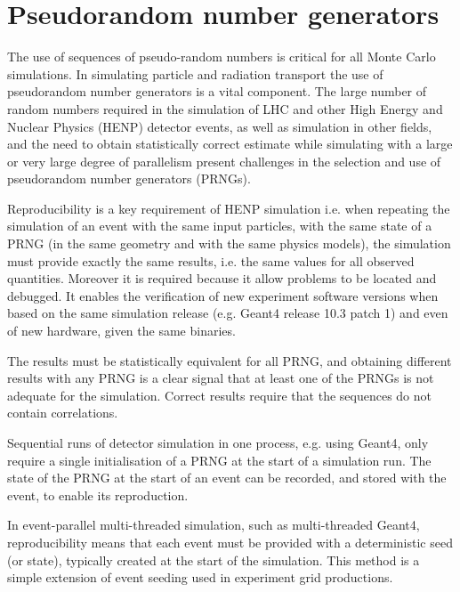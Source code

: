 \documentclass[12pt,a4paper]{article}
\begin{document}
{\hypertarget{pseudorandom-number-generators}{%
\section{\texorpdfstring{\textbf{Pseudorandom number
generators}}{Pseudorandom number generators}}\label{pseudorandom-number-generators}}

The use of sequences of pseudo-random numbers is critical for all Monte
Carlo simulations. In simulating particle and radiation transport the
use of pseudorandom number generators is a vital component. The large
number of random numbers required in the simulation of LHC and other
High Energy and Nuclear Physics (HENP) detector events, as well as
simulation in other fields, and the need to obtain statistically correct
estimate while simulating with a large or very large degree of
parallelism present challenges in the selection and use of pseudorandom
number generators (PRNGs).

Reproducibility is a key requirement of HENP simulation i.e. when
repeating the simulation of an event with the same input particles, with
the same state of a PRNG (in the same geometry and with the same physics
models), the simulation must provide exactly the same results, i.e. the
same values for all observed quantities. Moreover it is required because
it allow problems to be located and debugged. It enables the
verification of new experiment software versions when based on the same
simulation release (e.g. Geant4 release 10.3 patch 1) and even of new
hardware, given the same binaries.

The results must be statistically equivalent for all PRNG, and obtaining
different results with any PRNG is a clear signal that at least one of
the PRNGs is not adequate for the simulation. Correct results require
that the sequences do not contain correlations.

Sequential runs of detector simulation in one process, e.g. using
Geant4, only require a single initialisation of a PRNG at the start of a
simulation run. The state of the PRNG at the start of an event can be
recorded, and stored with the event, to enable its reproduction.

In event-parallel multi-threaded simulation, such as multi-threaded
Geant4, reproducibility means that each event must be provided with a
deterministic seed (or state), typically created at the start of the
simulation. This method is a simple extension of event seeding used in
experiment grid productions.

}
\end{document}
